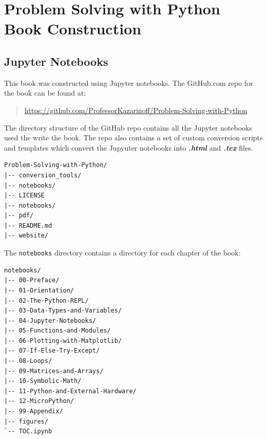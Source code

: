 \documentclass{book}
\begin{document}
    
        \section{Problem Solving with Python Book
Construction}\label{problem-solving-with-python-book-construction}
    




    
        \subsection{Jupyter Notebooks}\label{jupyter-notebooks}
    




    
        This book was constructed using Jupyter notebooks. The GitHub.com repo
for the book can be found at:

\begin{quote}
\url{https://github.com/ProfessorKazarinoff/Problem-Solving-with-Python}
\end{quote}
    




    
        The directory structure of the GitHub repo contains all the Jupyter
notebooks used the write the book. The repo also contains a set of
custom conversion scripts and templates which convert the Jupyuter
notebooks into \textbf{\emph{.html}} and \textbf{\emph{.tex}} files.
    




    
        \begin{lstlisting}
Problem-Solving-with-Python/
|-- conversion_tools/
|-- notebooks/
|-- LICENSE
|-- notebooks/
|-- pdf/
|-- README.md
|-- website/
\end{lstlisting}
    




    
        The \lstinline!notebooks! directory contains a directory for each
chapter of the book:
    




    
        \begin{lstlisting}
notebooks/
|-- 00-Preface/
|-- 01-Orientation/
|-- 02-The-Python-REPL/
|-- 03-Data-Types-and-Variables/
|-- 04-Jupyter-Notebooks/
|-- 05-Functions-and-Modules/
|-- 06-Plotting-with-Matplotlib/
|-- 07-If-Else-Try-Except/
|-- 08-Loops/
|-- 09-Matrices-and-Arrays/
|-- 10-Symbolic-Math/
|-- 11-Python-and-External-Hardware/
|-- 12-MicroPython/
|-- 99-Appendix/
|-- figures/
`-- TOC.ipynb
\end{lstlisting}
\end{document}

